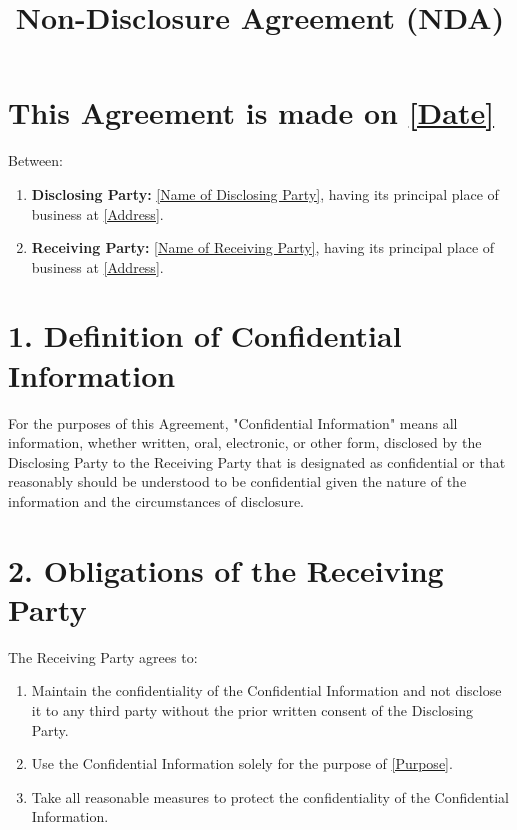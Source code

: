 \documentclass[12pt]{article}
\title{Non-Disclosure Agreement (NDA)}
\date{}
\begin{document}
\maketitle

\section*{This Agreement is made on \underline{[Date]}}

\noindent Between:

\begin{enumerate}
    \item \textbf{Disclosing Party:} \underline{[Name of Disclosing Party]}, having its principal place of business at \underline{[Address]}.
    \item \textbf{Receiving Party:} \underline{[Name of Receiving Party]}, having its principal place of business at \underline{[Address]}.
\end{enumerate}

\section*{1. Definition of Confidential Information}
For the purposes of this Agreement, "Confidential Information" means all information, whether written, oral, electronic, or other form, disclosed by the Disclosing Party to the Receiving Party that is designated as confidential or that reasonably should be understood to be confidential given the nature of the information and the circumstances of disclosure.

\section*{2. Obligations of the Receiving Party}
The Receiving Party agrees to:
\begin{enumerate}
    \item Maintain the confidentiality of the Confidential Information and not disclose it to any third party without the prior written consent of the Disclosing Party.
    \item Use the Confidential Information solely for the purpose of \underline{[Purpose]}.
    \item Take all reasonable measures to protect the confidentiality of the Confidential Information.
\end{enumerate}
\end{document}
